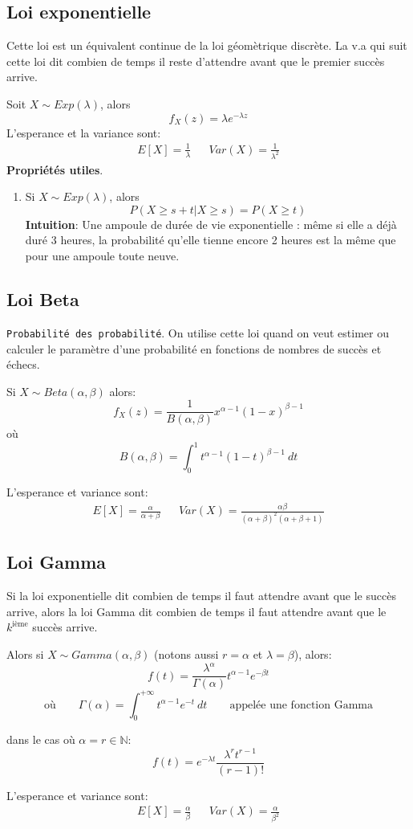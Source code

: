 \documentclass[a4paper]{article}
\newcommand{\N}{\mathbb{N}}
\begin{document}
\subsection{Loi exponentielle}
Cette loi est un équivalent continue de la loi géomètrique discrète.
La v.a qui suit cette loi dit combien de temps il reste d'attendre avant que le
premier succès arrive.

Soit $X \sim Exp(\lambda)$, alors
 \[
     f_X(z) = \lambda e^{-\lambda z}
\] 
L'esperance et la variance sont:
\begin{align*}
    E[X] = \frac{1}{\lambda} & & Var(X) = \frac{1}{\lambda^2}
\end{align*}
\textbf{Propriétés utiles}.
\begin{enumerate}
    \item Si $X \sim Exp(\lambda)$, alors
         \[
        P(X \ge s + t | X \ge s) = P(X \ge t)
        \] 
        \textbf{Intuition}: Une ampoule de durée de vie exponentielle :
        même si elle a déjà duré 3 heures, la probabilité qu’elle tienne
        encore 2 heures est la même que pour une ampoule toute neuve.
\end{enumerate}

\subsection{Loi Beta}
\texttt{Probabilité des probabilité}. On utilise cette loi quand on veut
estimer ou calculer le paramètre d'une probabilité en fonctions de nombres de
succès et échecs.

Si $X \sim Beta(\alpha, \beta)$ alors:
\[
    f_X(z) = \frac{1}{B(\alpha, \beta)}x^{\alpha-1}(1 - x)^{\beta - 1}
\] 
où
\[
    B(\alpha, \beta) = \int_{{0}}^{{1}} {t^{\alpha-1} (1-t)^{\beta - 1}} \: d{t} {}
\] 

L'esperance et variance sont:
 \begin{align*}
     E[X] = \frac{\alpha}{\alpha + \beta} & & Var(X) = \frac{\alpha \beta}{(\alpha + \beta)^2 (\alpha + \beta + 1)}
\end{align*}

\subsection{Loi Gamma}
Si la loi exponentielle dit combien de temps il faut attendre avant que le
succès arrive, alors la loi Gamma dit combien de temps il faut attendre avant
que le $k^{\text{ième}}$ succès arrive.

Alors si $X \sim Gamma(\alpha, \beta)$ (notons aussi $r = \alpha$ et  $\lambda = \beta$), alors:
\[
    f(t) = \frac{\lambda^{\alpha}}{\Gamma(\alpha)}t^{\alpha-1}e^{-\beta t}
\] 
\[
 \text{où} \qquad   \Gamma(\alpha) = \int_{{0}}^{{+\infty}} {t^{\alpha-1}e^{-t}} \: d{t} {} \qquad \text{appelée une fonction Gamma}
\] 

dans le cas où $\alpha = r \in \N$:
\[
    f(t) = e^{-\lambda t} \frac{\lambda^r t^{r-1}}{(r-1)!}
\] 

L'esperance et variance sont:
\begin{align*}
    E[X] = \frac{\alpha}{\beta} & & Var(X) = \frac{\alpha}{\beta^2}
\end{align*}
\end{document}
